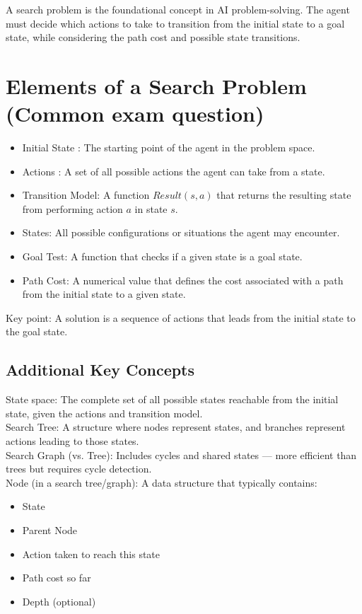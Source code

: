 
A search problem is the foundational concept in AI problem-solving.
The agent must decide which actions to take to transition from the initial state to a goal state,
while considering the path cost and possible state transitions.

\section{Elements of a Search Problem (Common exam question)}

\begin{itemize}
    \item Initial State :  The starting point of the agent in the problem space.
    \item Actions : A set of all possible actions the agent can take from a state.
    \item Transition Model: A function $Result(s, a)$ that returns the resulting state from performing action $a$ in state $s$.
    \item States: All possible configurations or situations the agent may encounter.
    \item Goal Test: A function that checks if a given state is a goal state.
    \item Path Cost: A numerical value that defines the cost associated with a path from the initial state to a given state.
\end{itemize}

Key point: A solution is a sequence of actions that leads from the initial state to the goal state.

\subsection{Additional Key Concepts}

State space: The complete set of all possible states reachable from the initial state, given the actions and transition model.\\

Search Tree: A structure where nodes represent states, and branches represent actions leading to those states. \\

Search Graph (vs. Tree): Includes cycles and shared states — more efficient than trees but requires cycle detection.\\

Node (in a search tree/graph):  
  A data structure that typically contains:
  \begin{itemize}
    \item State  
    \item Parent Node
    \item Action taken to reach this state
    \item Path cost so far
    \item Depth (optional)
  \end{itemize}

